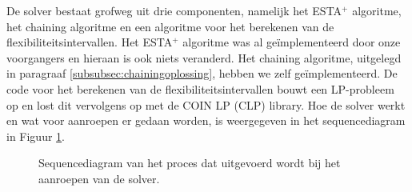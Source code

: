 De solver bestaat grofweg uit drie componenten, namelijk het ESTA$^+$ algoritme, het chaining algoritme en een algoritme voor het berekenen van de flexibiliteitsintervallen. Het ESTA$^+$ algoritme was al ge\"implementeerd door onze voorgangers en hieraan is ook niets veranderd. Het chaining algoritme, uitgelegd in paragraaf \ref{subsubsec:chainingoplossing}, hebben we zelf ge\"implementeerd. De code voor het berekenen van de flexibiliteitsintervallen bouwt een LP-probleem op en lost dit vervolgens op met de COIN LP (CLP) library. Hoe de solver werkt en wat voor aanroepen er gedaan worden, is weergegeven in het sequencediagram in Figuur \ref{fig:sd}.

\newpage
\begin{figure}[H]
\centering
\label{fig:sd}

\caption{Sequencediagram van het proces dat uitgevoerd wordt bij het aanroepen van de solver.} 
\end{figure}

\newpage
